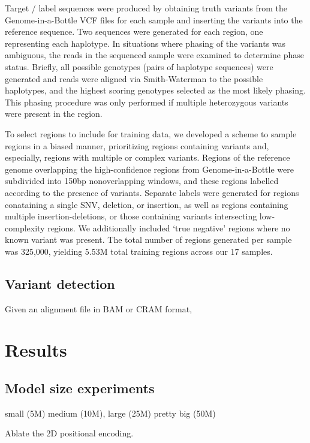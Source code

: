 \documentclass[]{article}
\begin{document}
Target / label sequences were produced by obtaining truth variants from the Genome-in-a-Bottle VCF files for each sample and inserting the variants into the reference sequence. Two sequences were generated for each region, one representing each haplotype. In situations where phasing of the variants was ambiguous, the reads in the sequenced sample were examined to determine phase status. Briefly, all possible genotypes (pairs of haplotype sequences) were generated and reads were aligned via Smith-Waterman to the possible haplotypes, and the highest scoring genotypes selected as the most likely phasing. This phasing procedure was only performed if multiple heterozygous variants were present in the region. 

To select regions to include for training data, we developed a scheme to sample regions in a biased manner, prioritizing regions containing variants and, especially, regions with multiple or complex variants. Regions of the reference genome overlapping the high-confidence regions from Genome-in-a-Bottle were subdivided into 150bp nonoverlapping windows, and these regions labelled according to the presence of variants. Separate labels were generated for regions conataining a single SNV, deletion, or insertion, as well as regions containing multiple insertion-deletions, or those containing variants intersecting  low-complexity regions. We additionally included `true negative' regions where no known variant was present. The total number of regions generated per sample was 325,000, yielding 5.53M total training regions across our 17 samples.


\subsection{Variant detection}

Given an alignment file in BAM or CRAM format, 

\section{Results}

\subsection{Model size experiments}

 small (5M) medium (10M), large (25M) pretty big (50M)

 
 Ablate the 2D positional encoding.
 
\end{document}
